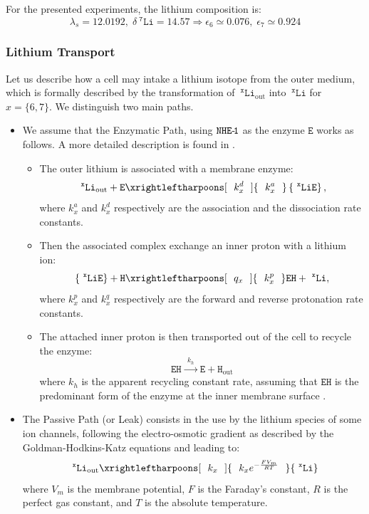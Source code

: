 \documentclass[aps,onecolumn,12pt]{revtex4}
\newcommand{\mychem}[1]{\mathtt{#1}}
\newcommand{\spLi}[1]{{~^{\mychem{#1}}\mychem{Li}}}
\newcommand{\spEout}{\mychem{E}}
\newcommand{\spLiE}[1]{\left\lbrace\spLi{#1}\spEout\right\rbrace}
\newcommand{\spLiOut}[1]{{\spLi{#1}}_{\mathrm{out}}}
\newcommand{\spEHin}{\mychem{EH}}
\newcommand{\spproton}{\mychem{H}}
\newcommand{\deltaLi}{ {\delta\!\!\!\spLi{7}} }
\newcommand{\NHE}[1]{\mychem{NHE}{\mychem{\hbox{-}\!#1}}}
\newcommand{\todo}[1]{\framebox{\textbf{\color{WildStrawberry}{#1}}}}
\begin{document}
For the presented experiments, the lithium composition is:
\begin{equation}
	\lambda_s = 12.0192, \; \deltaLi = 14.57 \Rightarrow \epsilon_6 \simeq 0.076,\;\epsilon_7 \simeq 0.924
\end{equation}


\subsubsection{Lithium Transport}

Let us describe how a cell may intake a lithium isotope from the outer medium, which is formally described by the transformation
of $\spLiOut{x}$ into $\spLi{x}$ for $x=\lbrace 6,7 \rbrace$. We distinguish two main paths.

\begin{itemize}
\item We assume that the Enzymatic Path, using $\NHE{1}$ as the enzyme $\spEout$ works as follows. A more detailed description is found in \todo{ref}.
	\begin{itemize}
	\item The outer lithium is associated with a membrane enzyme:
	\begin{equation}
		\label{eq:pre}
		\spLiOut{x} + \spEout  \xrightleftharpoons[~~k^d_x~~]{~~k^a_x~~} \spLiE{x},
	\end{equation}
	where $k^a_x$ and $k^d_x$ respectively are the association and the dissociation rate constants.
	
	\item Then the associated complex exchange an inner proton with a lithium ion:
	\begin{equation}
		\label{eq:xch}
		\spLiE{x} + \spproton   \xrightleftharpoons[~~q_x~~]{~~k^p_x~~}   \spEHin + \spLi{x}, 
	\end{equation}
	where $k^p_x$ and $k^q_x$ respectively are the forward and reverse protonation rate constants.
	
	\item The attached inner proton is then transported out of the cell to recycle the enzyme:
	\begin{equation}
			\spEHin   \xrightarrow{~~k_h~~}   \spEout + \spproton_{\mathrm{out}} 
	\end{equation}	
	where $k_h$ is the  apparent recycling constant rate, assuming that $\spEHin$ is the predominant form of the enzyme at the inner membrane surface \todo{Lacroix EMBO 2004 fig 3A}.
	\end{itemize}

\item The Passive Path (or Leak) consists in the use by the lithium species of some ion channels, following the electro-osmotic gradient as described by the Goldman-Hodkins-Katz \todo{ref} equations and leading to:
	\begin{equation}
	\label{eq:ghk}
		\spLiOut{x} \xrightleftharpoons[~~k_x~~]{~~k_x e^{-\frac{FV_m}{RT}}~~}   \spLi{x} 
	\end{equation}
where $V_m$ is the membrane potential, $F$ is the Faraday's constant, $R$ is the perfect gas constant, and $T$ is the absolute temperature.

\end{itemize}
\end{document}
